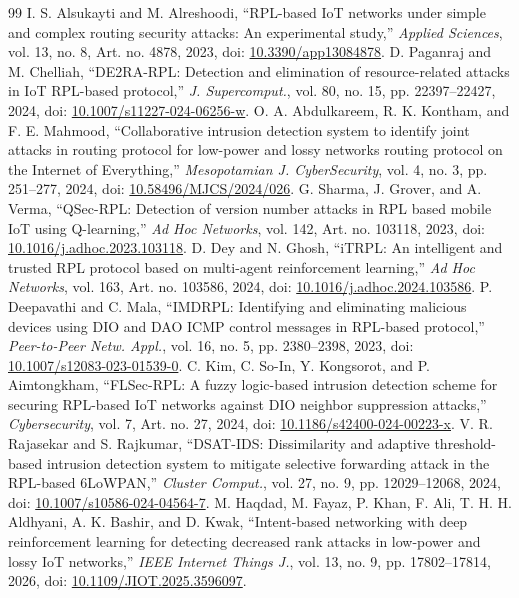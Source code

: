 \documentclass[journal]{IEEEtran}
\begin{document}
\begin{thebibliography}{99}
 I. S. Alsukayti and M. Alreshoodi, ``RPL-based IoT networks under simple and complex routing security attacks: An experimental study,'' \emph{Applied Sciences}, vol. 13, no. 8, Art. no. 4878, 2023, doi: \href{https://doi.org/10.3390/app13084878}{10.3390/app13084878}.
 D. Paganraj and M. Chelliah, ``DE2RA-RPL: Detection and elimination of resource-related attacks in IoT RPL-based protocol,'' \emph{J. Supercomput.}, vol. 80, no. 15, pp. 22397--22427, 2024, doi: \href{https://doi.org/10.1007/s11227-024-06256-w}{10.1007/s11227-024-06256-w}.
 O. A. Abdulkareem, R. K. Kontham, and F. E. Mahmood, ``Collaborative intrusion detection system to identify joint attacks in routing protocol for low-power and lossy networks routing protocol on the Internet of Everything,'' \emph{Mesopotamian J. CyberSecurity}, vol. 4, no. 3, pp. 251--277, 2024, doi: \href{https://doi.org/10.58496/MJCS/2024/026}{10.58496/MJCS/2024/026}.
 G. Sharma, J. Grover, and A. Verma, ``QSec-RPL: Detection of version number attacks in RPL based mobile IoT using Q-learning,'' \emph{Ad Hoc Networks}, vol. 142, Art. no. 103118, 2023, doi: \href{https://doi.org/10.1016/j.adhoc.2023.103118}{10.1016/j.adhoc.2023.103118}.
 D. Dey and N. Ghosh, ``iTRPL: An intelligent and trusted RPL protocol based on multi-agent reinforcement learning,'' \emph{Ad Hoc Networks}, vol. 163, Art. no. 103586, 2024, doi: \href{https://doi.org/10.1016/j.adhoc.2024.103586}{10.1016/j.adhoc.2024.103586}.
 P. Deepavathi and C. Mala, ``IMDRPL: Identifying and eliminating malicious devices using DIO and DAO ICMP control messages in RPL-based protocol,'' \emph{Peer-to-Peer Netw. Appl.}, vol. 16, no. 5, pp. 2380--2398, 2023, doi: \href{https://doi.org/10.1007/s12083-023-01539-0}{10.1007/s12083-023-01539-0}.
 C. Kim, C. So-In, Y. Kongsorot, and P. Aimtongkham, ``FLSec-RPL: A fuzzy logic-based intrusion detection scheme for securing RPL-based IoT networks against DIO neighbor suppression attacks,'' \emph{Cybersecurity}, vol. 7, Art. no. 27, 2024, doi: \href{https://doi.org/10.1186/s42400-024-00223-x}{10.1186/s42400-024-00223-x}.
 V. R. Rajasekar and S. Rajkumar, ``DSAT-IDS: Dissimilarity and adaptive threshold-based intrusion detection system to mitigate selective forwarding attack in the RPL-based 6LoWPAN,'' \emph{Cluster Comput.}, vol. 27, no. 9, pp. 12029--12068, 2024, doi: \href{https://doi.org/10.1007/s10586-024-04564-7}{10.1007/s10586-024-04564-7}.
 M. Haqdad, M. Fayaz, P. Khan, F. Ali, T. H. H. Aldhyani, A. K. Bashir, and D. Kwak, ``Intent-based networking with deep reinforcement learning for detecting decreased rank attacks in low-power and lossy IoT networks,'' \emph{IEEE Internet Things J.}, vol. 13, no. 9, pp. 17802--17814, 2026, doi: \href{https://doi.org/10.1109/JIOT.2025.3596097}{10.1109/JIOT.2025.3596097}.

\end{thebibliography}
\end{document}
